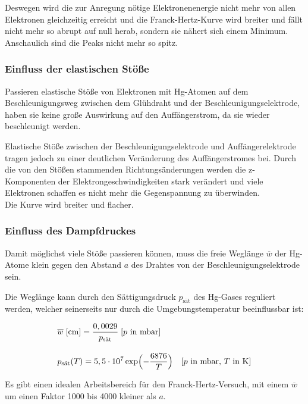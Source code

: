 \documentclass[titlepage = firstcover]{scrartcl}
\begin{document}
                Deswegen wird die zur Anregung nötige Elektronenenergie nicht mehr von allen Elektronen gleichzeitig erreicht und die Franck-Hertz-Kurve wird breiter und fällt nicht mehr so abrupt auf null herab, sondern sie nähert sich einem Minimum. Anschaulich sind die Peaks nicht mehr so spitz.

            \subsubsection{Einfluss der elastischen Stöße}
                Passieren elastische Stöße von Elektronen mit Hg-Atomen auf dem Beschleunigungsweg zwischen dem Glühdraht und der Beschleunigungselektrode, haben sie keine große Auswirkung auf den Auffängerstrom, da sie wieder beschleunigt werden.

                Elastische Stöße zwischen der Beschleunigungselektrode und Auffängerelektrode tragen jedoch zu einer deutlichen Veränderung des Auffängerstromes bei. Durch die von den Stößen stammenden Richtungsänderungen werden die z-Komponenten der Elektrongeschwindigkeiten stark verändert und viele Elektronen schaffen es nicht mehr die Gegenspannung zu überwinden. \\

                Die Kurve wird breiter und flacher.

            \subsubsection{Einfluss des Dampfdruckes}
                Damit möglichst viele Stöße passieren können, muss die freie Weglänge $\overline{w}$ der Hg-Atome klein gegen den Abstand $a$ des Drahtes von der Beschleunigungselektrode sein.

                Die Weglänge kann durch den Sättigungsdruck $p_{\text{sät}}$ des Hg-Gases reguliert werden, welcher seinerseits nur durch die Umgebungstemperatur beeinflussbar ist:

                \begin{align}
                    &\overline{w} \; [\text{cm}] = \frac{0,0029}{p_{\text{sät}}} \; [p\text{ in mbar}] \\[10pt]
                    &p_{\text{sät}}(T) = 5,5 \cdot 10^7 \exp\Bigl(-\frac{6876}{T}\Bigr) \quad [p\text{ in mbar, } T\text{ in K}]
                \end{align}

                Es gibt einen idealen Arbeitsbereich für den Franck-Hertz-Versuch, mit einem $\overline{w}$ um einen Faktor 1000 bis 4000 kleiner als $a$.
\end{document}
